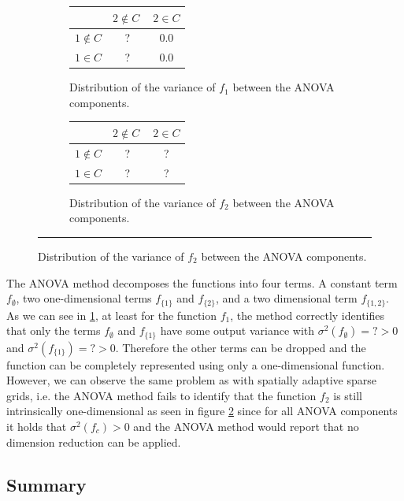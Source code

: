 \documentclass[
  a4paper,  %
  twoside,  %
  bibliography=totoc,
  headsepline,
  cleardoublepage=empty,
  parskip=half,
  draft=false
]{scrbook}
\newcommand{\delimit}{{\color{charcoal}\noindent\rule{\textwidth}{1pt}}}
\begin{document}
\begin{mdframed}[style=style]
\vspace{2.5mm}
\begin{figure}[H]
\begin{subfigure}{.50\textwidth}
  \centering
  \begin{tabular}{ l c c }
\hline \hline
& $2 \notin C~$ & $2 \in C$ \\
\hline
$1 \notin C$ & ? & 0.0\\
$1 \in C$ & ? & 0.0\\
\end{tabular}
  \caption{Distribution of the variance of $f_1$ between the ANOVA components.}
  \label{fig:anova_f1}
\end{subfigure}
\begin{subfigure}{.49\textwidth}
  \centering
  \begin{tabular}{ l c c }
\hline \hline
& $2 \notin C~$ & $2 \in C$ \\
\hline
$1 \notin C$ & ? & ?\\
$1 \in C$ & ? & ?\\
\end{tabular}
  \caption{Distribution of the variance of $f_2$ between the ANOVA components.}
  \label{fig:anova_f2}
\end{subfigure}
\delimit
{}
\label{fig:anova}
\end{figure}
\end{mdframed}

The ANOVA method decomposes the functions into four terms.
A constant term $f_\emptyset$, two one-dimensional terms $f_{\{1\}}$ and $f_{\{2\}}$, and a two dimensional term $f_{\{1,2\}}$.
As we can see in \cref{fig:anova_f1}, at least for the function $f_1$, the method correctly identifies that only the terms $f_\emptyset$ and $f_{\{1\}}$ have some output variance with $\sigma^2(f_\emptyset)=? > 0$ and $\sigma^2(f_{\{1\}})=? > 0$.
Therefore the other terms can be dropped and the function can be completely represented using only a one-dimensional function.
However, we can observe the same problem as with spatially adaptive sparse grids, i.e. the ANOVA method fails to identify that the function $f_2$ is still intrinsically one-dimensional as seen in figure \cref{fig:anova_f2} since for all ANOVA components it holds that $\sigma^2(f_{c}) > 0$ and the ANOVA method would report that no dimension reduction can be applied.

\subsection{Summary}
\end{document}
